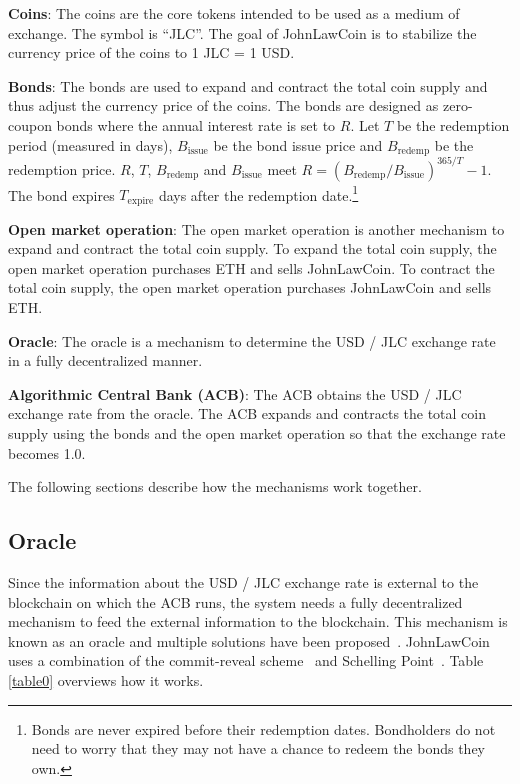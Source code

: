 \documentclass[dvipdfmx,a4paper]{article}
\begin{document}
\begin{description}
\item{\textbf{Coins}}: The coins are the core tokens intended to be used as a medium of exchange. The symbol is ``JLC''. The goal of JohnLawCoin is to stabilize the currency price of the coins to 1 JLC = 1 USD.
\item{\textbf{Bonds}}: The bonds are used to expand and contract the total coin supply and thus adjust the currency price of the coins. The bonds are designed as zero-coupon bonds where the annual interest rate is set to $R$. Let $T$ be the redemption period (measured in days), $B_{\mathrm{issue}}$ be the bond issue price and $B_{\mathrm{redemp}}$ be the redemption price. $R$, $T$, $B_{\mathrm{redemp}}$ and $B_{\mathrm{issue}}$ meet $R=(B_{\mathrm{redemp}}/B_{\mathrm{issue}})^{365/T}-1$. The bond expires $T_{\mathrm{expire}}$ days after the redemption date.\footnote{Bonds are never expired before their redemption dates. Bondholders do not need to worry that they may not have a chance to redeem the bonds they own.}
\item{\textbf{Open market operation}}: The open market operation is another mechanism to expand and contract the total coin supply. To expand the total coin supply, the open market operation purchases ETH and sells JohnLawCoin. To contract the total coin supply, the open market operation purchases JohnLawCoin and sells ETH.
\item{\textbf{Oracle}}: The oracle is a mechanism to determine the USD / JLC exchange rate in a fully decentralized manner.
\item{\textbf{Algorithmic Central Bank (ACB)}}: The ACB obtains the USD / JLC exchange rate from the oracle. The ACB expands and contracts the total coin supply using the bonds and the open market operation so that the exchange rate becomes 1.0.
\end{description}

The following sections describe how the mechanisms work together.

\subsection{Oracle}

Since the information about the USD / JLC exchange rate is external to the blockchain on which the ACB runs, the system needs a fully decentralized mechanism to feed the external information to the blockchain. This mechanism is known as an oracle and multiple solutions have been proposed~\cite{chainlink,adler2018astraea}. JohnLawCoin uses a combination of the commit-reveal scheme~\cite{wohrer2018design} and Schelling Point~\cite{shellingpoint}. Table \ref{table0} overviews how it works.
\end{document}
